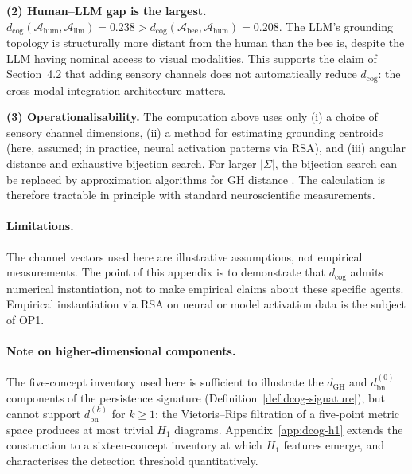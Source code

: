 \textbf{(2) Human--LLM gap is the largest.}
$d_{\mathrm{cog}}(\mathcal{A}_{\mathrm{hum}},
\mathcal{A}_{\mathrm{llm}}) = 0.238 >
d_{\mathrm{cog}}(\mathcal{A}_{\mathrm{bee}},
\mathcal{A}_{\mathrm{hum}}) = 0.208$.
The LLM's grounding topology is structurally more distant from the
human than the bee is, despite the LLM having nominal access to visual
modalities. This supports the claim of Section~4.2 that adding sensory
channels does not automatically reduce $d_{\mathrm{cog}}$: the
cross-modal integration architecture matters.

\textbf{(3) Operationalisability.}
The computation above uses only (i) a choice of sensory channel
dimensions, (ii) a method for estimating grounding centroids (here,
assumed; in practice, neural activation patterns via RSA), and (iii)
angular distance and exhaustive bijection search. For larger
$|\Sigma|$, the bijection search can be replaced by approximation
algorithms for GH distance \cite{memoli2007}. The calculation is
therefore tractable in principle with standard neuroscientific
measurements.

\paragraph{Limitations.}
The channel vectors used here are illustrative assumptions, not
empirical measurements. The point of this appendix is to demonstrate
that $d_{\mathrm{cog}}$ admits numerical instantiation, not to make
empirical claims about these specific agents. Empirical instantiation
via RSA on neural or model activation data is the subject of OP1.

\paragraph{Note on higher-dimensional components.}
The five-concept inventory used here is sufficient to illustrate the
$d_{\mathrm{GH}}$ and $d_{\mathrm{bn}}^{(0)}$ components of the
persistence signature
(Definition~\ref{def:dcog-signature}), but cannot support
$d_{\mathrm{bn}}^{(k)}$ for $k \geq 1$: the Vietoris--Rips filtration
of a five-point metric space produces at most trivial $H_1$ diagrams.
Appendix~\ref{app:dcog-h1} extends the construction to a sixteen-concept
inventory at which $H_1$ features emerge, and characterises the
detection threshold quantitatively.
